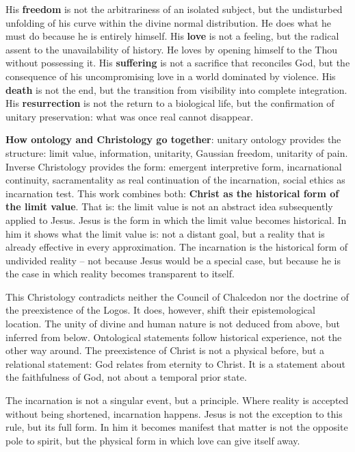 \documentclass[
  english,
]{article}
\begin{document}
His \textbf{freedom} is not the arbitrariness of an isolated subject,
but the undisturbed unfolding of his curve within the divine normal
distribution. He does what he must do because he is entirely himself.
His \textbf{love} is not a feeling, but the radical assent to the
unavailability of history. He loves by opening himself to the Thou
without possessing it. His \textbf{suffering} is not a sacrifice that
reconciles God, but the consequence of his uncompromising love in a
world dominated by violence. His \textbf{death} is not the end, but the
transition from visibility into complete integration. His
\textbf{resurrection} is not the return to a biological life, but the
confirmation of unitary preservation: what was once real cannot
disappear.

\textbf{How ontology and Christology go together}: unitary ontology
provides the structure: limit value, information, unitarity, Gaussian
freedom, unitarity of pain. Inverse Christology provides the form:
emergent interpretive form, incarnational continuity, sacramentality as
real continuation of the incarnation, social ethics as incarnation test.
This work combines both: \textbf{Christ as the historical form of the
limit value}. That is: the limit value is not an abstract idea
subsequently applied to Jesus. Jesus is the form in which the limit
value becomes historical. In him it shows what the limit value is: not a
distant goal, but a reality that is already effective in every
approximation. The incarnation is the historical form of undivided
reality -- not because Jesus would be a special case, but because he is
the case in which reality becomes transparent to itself.

This Christology contradicts neither the Council of Chalcedon nor the
doctrine of the preexistence of the Logos. It does, however, shift their
epistemological location. The unity of divine and human nature is not
deduced from above, but inferred from below. Ontological statements
follow historical experience, not the other way around. The preexistence
of Christ is not a physical before, but a relational statement: God
relates from eternity to Christ. It is a statement about the
faithfulness of God, not about a temporal prior state.

The incarnation is not a singular event, but a principle. Where reality
is accepted without being shortened, incarnation happens. Jesus is not
the exception to this rule, but its full form. In him it becomes
manifest that matter is not the opposite pole to spirit, but the
physical form in which love can give itself away.
\end{document}
